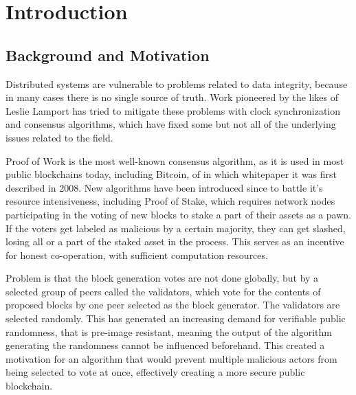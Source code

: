 \chapter{Introduction}
\label{Introduction}


\section{Background and Motivation}
\label{Background and Motivation}

Distributed systems are vulnerable to problems related to data integrity, because in many cases there is no single source of truth. Work pioneered by the likes of Leslie Lamport has tried to mitigate these problems with clock synchronization and consensus algorithms, which have fixed some but not all of the underlying issues related to the field.


Proof of Work is the most well-known consensus algorithm, as it is used in most public blockchains today, including Bitcoin, of in which whitepaper it was first described in 2008. New algorithms have been introduced since to battle it's resource intensiveness, including Proof of Stake, which requires network nodes participating in the voting of new blocks to stake a part of their assets as a pawn. If the voters get labeled as malicious by a certain majority, they can get slashed, losing all or a part of the staked asset in the process. This serves as an incentive for honest co-operation, with sufficient computation resources.

Problem is that the block generation votes are not done globally, but by a selected group of peers called the validators, which vote for the contents of proposed blocks by one peer selected as the block generator. The validators are selected randomly. This has generated an increasing demand for verifiable public randomness, that is pre-image resistant, meaning the output of the algorithm generating the randomness cannot be influenced beforehand. This created a motivation for an algorithm that would prevent multiple malicious actors from being selected to vote at once, effectively creating a more secure public blockchain.

